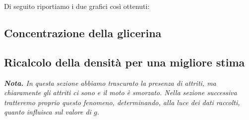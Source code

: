 \documentclass{article}
\begin{document}
Di seguito riportiamo i due grafici così ottenuti:

\begin{figure}[H]

  \centering
  \hfil{}
\end{figure}

\subsection{Concentrazione della glicerina}

\subsection{Ricalcolo della densità per una migliore stima}

\emph{
  \textbf{Nota.} In questa sezione abbiamo trascurato la presenza di
  attriti, ma chiaramente gli attriti ci sono e il moto è smorzato.
  Nella sezione successiva tratteremo proprio questo fenomeno,
  determinando, alla luce dei dati raccolti, quanto influisca
  sul valore di $g$.
}
\vspace{2mm}
\end{document}
